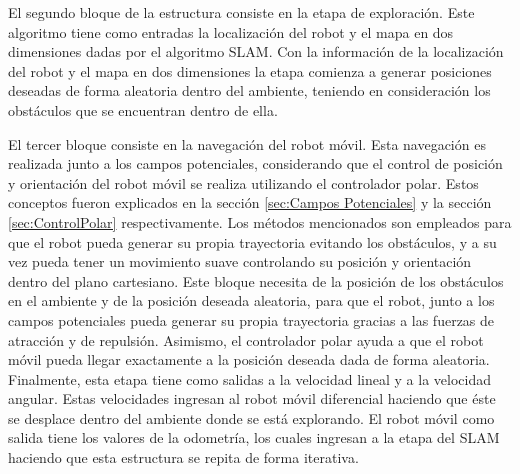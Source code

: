 
El segundo bloque de la estructura consiste en la etapa de exploración. Este algoritmo tiene 
como entradas la localización del robot y el mapa en dos dimensiones dadas por el algoritmo
SLAM. Con la información de la localización del robot y el mapa en dos dimensiones la etapa 
comienza a generar posiciones deseadas de forma aleatoria dentro del ambiente, teniendo en 
consideración los obstáculos que se encuentran dentro de ella. 

El tercer bloque consiste en la navegación del robot móvil. Esta navegación es realizada 
junto a los campos potenciales, considerando que el control de posición y orientación del robot móvil se realiza utilizando el controlador polar. Estos conceptos fueron explicados en la sección 
\ref{sec:Campos Potenciales} y la sección \ref{sec:ControlPolar} respectivamente. Los métodos mencionados son empleados para que el robot pueda generar su propia trayectoria evitando
los obstáculos, y a su vez pueda tener un movimiento suave controlando su posición y 
orientación dentro del plano cartesiano. Este bloque necesita de la posición de los obstáculos
en el ambiente y de la posición deseada aleatoria, para que el robot, junto a los campos
potenciales pueda generar su propia trayectoria gracias a las fuerzas de atracción y de 
repulsión. Asimismo, el controlador polar ayuda a que el robot móvil pueda llegar exactamente
a la posición deseada dada de forma aleatoria. Finalmente, esta etapa tiene como salidas a la 
velocidad lineal y a la velocidad angular. Estas velocidades ingresan al robot móvil diferencial
haciendo que éste se desplace dentro del ambiente donde se está explorando. El robot móvil 
como salida tiene los valores de la odometría, los cuales ingresan a la etapa del SLAM haciendo que 
esta estructura se repita de forma iterativa.


